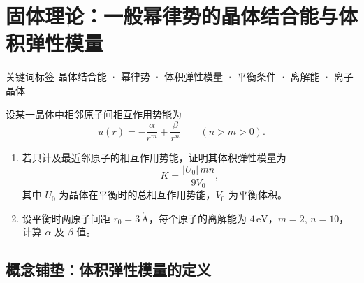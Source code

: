 \section{固体理论：一般幂律势的晶体结合能与体积弹性模量}
\label{sec:power-law-potential}

\begin{tipbox}{关键词标签}
晶体结合能 · 幂律势 · 体积弹性模量 · 平衡条件 · 离解能 · 离子晶体
\end{tipbox}

\begin{modelbox}
设某一晶体中相邻原子间相互作用势能为
\[
  u(r) = -\frac{\alpha}{r^m} + \frac{\beta}{r^n} \qquad (n > m > 0).
\]
\begin{enumerate}[nosep]
  \item 若只计及最近邻原子的相互作用势能，证明其体积弹性模量为
    \[
      K = \frac{|U_0|\, mn}{9V_0},
    \]
    其中 $U_0$ 为晶体在平衡时的总相互作用势能，$V_0$ 为平衡体积。
  \item 设平衡时两原子间距 $r_0 = 3\,\mathring{\mathrm{A}}$，每个原子的离解能为 $4\,\text{eV}$，$m=2$, $n=10$，计算 $\alpha$ 及 $\beta$ 值。
\end{enumerate}
\end{modelbox}

\subsection{概念铺垫：体积弹性模量的定义}

